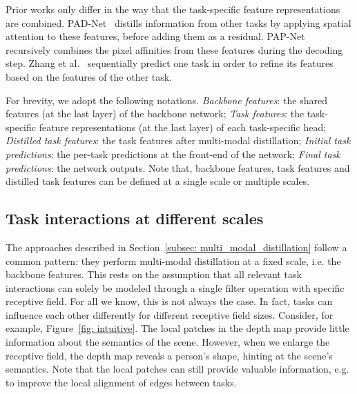 \documentclass[runningheads]{llncs}
\begin{document}
Prior works only differ in the way that the task-specific feature representations are combined. PAD-Net~\cite{xu2018pad} distills information from other tasks by applying spatial attention to these features, before adding them as a residual. PAP-Net~\cite{zhang2019pattern} recursively combines the pixel affinities from these features during the decoding step. Zhang et al.~\cite{zhang2018joint} sequentially predict one task in order to refine its features based on the features of the other task. 

For brevity, we adopt the following notations. 
\textit{Backbone features}: the shared features (at the last layer) of the backbone network; 
\textit{Task features}: the task-specific feature representations (at the last layer) of each task-specific head; 
\textit{Distilled task features}: the task features after multi-modal distillation; 
\textit{Initial task predictions}: the per-task predictions at the front-end of the network; 
\textit{Final task predictions}: the network outputs. 
Note that, backbone features, task features and distilled task features can be defined at a single scale or multiple scales.

\subsection{Task interactions at different scales}
\label{subsec: multi_scale_task_interactions}
The approaches described in Section~\ref{subsec: multi_modal_distillation} follow a common pattern: they perform multi-modal distillation at a fixed scale, i.e. the backbone features. This rests on the assumption that all relevant task interactions can solely be modeled through a single filter operation with specific receptive field. For all we know, this is not always the case. In fact, tasks can influence each other differently for different receptive field sizes. Consider, for example, Figure~\ref{fig: intuitive}. The local patches in the depth map provide little information about the semantics of the scene. However, when we enlarge the receptive field, the depth map reveals a person's shape, hinting at the scene's semantics. Note that the local patches can still provide valuable information, e.g. to improve the local alignment of edges between tasks. 
\end{document}
